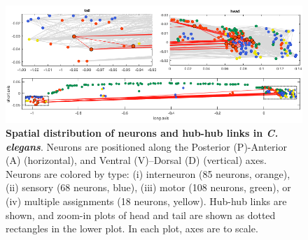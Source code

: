 \documentclass[10pt,letterpaper]{article}
\begin{document}
\begin{figure}[h]
\centering
    \includegraphics[width=1\textwidth]{SpatialPlot.png}
\caption{
\textbf{Spatial distribution of neurons and hub-hub links in \emph{C. elegans}}.
Neurons are positioned along the Posterior (P)-Anterior (A) (horizontal), and Ventral (V)--Dorsal (D) (vertical) axes.
Neurons are colored by type:
(i) interneuron (85 neurons, orange),
(ii) sensory (68 neurons, blue),
(iii) motor (108 neurons, green), or
(iv) multiple assignments (18 neurons, yellow).
Hub-hub links are shown, and zoom-in plots of head and tail are shown as dotted rectangles in the lower plot.
In each plot, axes are to scale.
\label{fig:neuronsSpace}
}
\end{figure}
\end{document}
